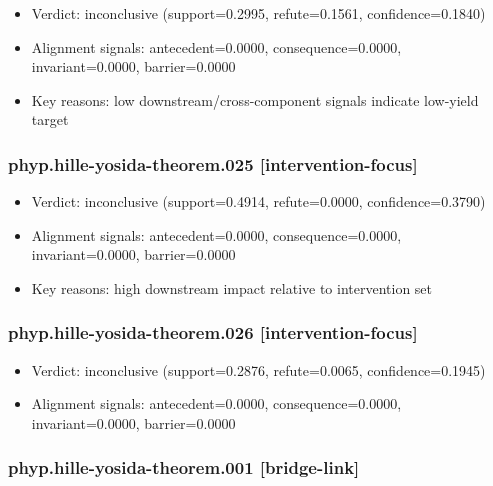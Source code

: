 \documentclass[
]{article}
\providecommand{\tightlist}{%
  \setlength{\itemsep}{0pt}\setlength{\parskip}{0pt}}
\begin{document}
\begin{itemize}
\tightlist
\item
  Verdict: inconclusive (support=0.2995, refute=0.1561,
  confidence=0.1840)
\item
  Alignment signals: antecedent=0.0000, consequence=0.0000,
  invariant=0.0000, barrier=0.0000
\item
  Key reasons: low downstream/cross-component signals indicate low-yield
  target
\end{itemize}

\subsubsection{phyp.hille-yosida-theorem.025
{[}intervention-focus{]}}\label{phyphille-yosida-theorem025-intervention-focus}

\begin{itemize}
\tightlist
\item
  Verdict: inconclusive (support=0.4914, refute=0.0000,
  confidence=0.3790)
\item
  Alignment signals: antecedent=0.0000, consequence=0.0000,
  invariant=0.0000, barrier=0.0000
\item
  Key reasons: high downstream impact relative to intervention set
\end{itemize}

\subsubsection{phyp.hille-yosida-theorem.026
{[}intervention-focus{]}}\label{phyphille-yosida-theorem026-intervention-focus}

\begin{itemize}
\tightlist
\item
  Verdict: inconclusive (support=0.2876, refute=0.0065,
  confidence=0.1945)
\item
  Alignment signals: antecedent=0.0000, consequence=0.0000,
  invariant=0.0000, barrier=0.0000
\end{itemize}

\subsubsection{phyp.hille-yosida-theorem.001
{[}bridge-link{]}}\label{phyphille-yosida-theorem001-bridge-link}
\end{document}

